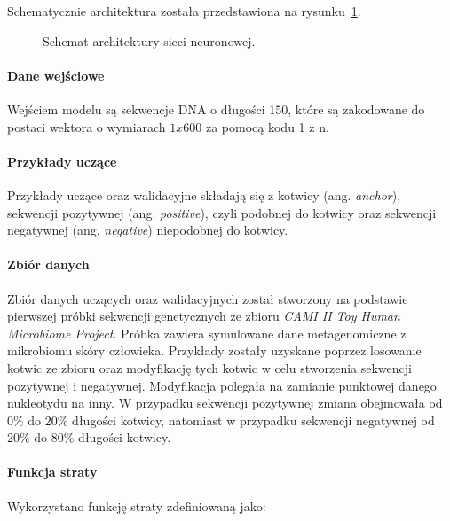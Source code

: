                 Schematycznie architektura została przedstawiona na rysunku~\ref{Picture:NeuralModel}. 

                \begin{figure}
                    \begin{center}
                        
                    \end{center}
                    \caption{
                        Schemat architektury sieci neuronowej.
                    }\label{Picture:NeuralModel}
                \end{figure}

            \paragraph{Dane wejściowe}
                Wejściem modelu są sekwencje DNA o długości $150$, które są zakodowane do postaci wektora o wymiarach $1x600$ za pomocą kodu 1 z n\cite{HarrisDavid:2007}.
            
            \paragraph{Przykłady uczące}
                Przykłady uczące oraz walidacyjne składają się z kotwicy (ang. \textit{anchor}), sekwencji pozytywnej (ang. \textit{positive}), czyli podobnej do kotwicy oraz sekwencji negatywnej (ang. \textit{negative}) niepodobnej do kotwicy.
            
            \paragraph{Zbiór danych}
                Zbiór danych uczących oraz walidacyjnych został stworzony na podstawie pierwszej próbki sekwencji genetycznych ze zbioru \textit{CAMI II Toy Human Microbiome Project}\cite{Fritz:2019}. Próbka zawiera symulowane dane metagenomiczne z mikrobiomu skóry człowieka. Przykłady zostały uzyskane poprzez losowanie kotwic ze zbioru oraz modyfikację tych kotwic w celu stworzenia sekwencji pozytywnej i negatywnej. Modyfikacja polegała na zamianie punktowej danego nukleotydu na inny. W przypadku sekwencji pozytywnej zmiana obejmowała od $0\%$ do $20\%$ długości kotwicy, natomiast w przypadku sekwencji negatywnej od $20\%$ do $80\%$ długości kotwicy.

            \paragraph{Funkcja straty}
                Wykorzystano funkcję straty zdefiniowaną jako:

